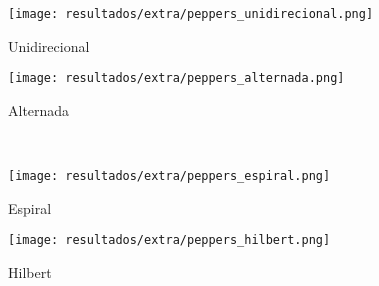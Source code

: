 \begin{subfigure}{0.33\textwidth}
    \centering
    \texttt{[image: resultados/extra/peppers\_unidirecional.png]}
    \caption{Unidirecional}
    \label{fig:peppers:unidirecional}
\end{subfigure}%
\begin{subfigure}{0.33\textwidth}
    \centering
    \texttt{[image: resultados/extra/peppers\_alternada.png]}
    \caption{Alternada}
    \label{fig:peppers:alternada}
\end{subfigure}\\[8pt]
\begin{subfigure}{0.33\textwidth}
    \centering
    \texttt{[image: resultados/extra/peppers\_espiral.png]}
    \caption{Espiral}
    \label{fig:peppers:espiral}
\end{subfigure}%
\begin{subfigure}{0.33\textwidth}
    \centering
    \texttt{[image: resultados/extra/peppers\_hilbert.png]}
    \caption{Hilbert}
    \label{fig:peppers:hilbert}
\end{subfigure}
